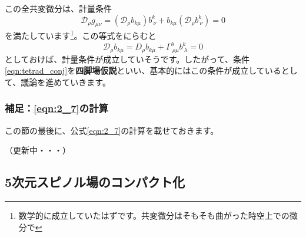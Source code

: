 \documentclass[unicode,a4paper,11pt]{ltjsarticle}
\begin{document}
この全共変微分は、計量条件
\begin{equation}
   \mathcal{D}_{\rho}g_{\mu\nu}
   =
   (\mathcal{D}_{\rho}b_{k\mu})b^{k}_{\ \nu}
   +
   b_{k\mu}(\mathcal{D}_{\rho}b^{k}_{\ \nu})
   =
   0
\end{equation}
を満たしています\footnote{
   数学的に成立していたはずです。共変微分はそもそも曲がった時空上での微分で
}。この等式をにらむと
\begin{equation}
   \mathcal{D}_{\rho}b_{k\mu}
   =
   D_{\rho}b_{k\mu}
   +
   \Gamma^{\lambda}_{\ \rho\mu} b^{k}_{\ \lambda}
   =
   0
   \label{eqn:tetrad_conj}
\end{equation}
としておけば、計量条件が成立していそうです。したがって、条件\eqref{eqn:tetrad_conj}を\textbf{四脚場仮説}といい、基本的にはこの条件が成立しているとして、議論を進めていきます。




\subsubsection*{補足：\texorpdfstring{\eqref{eqn:2_7}}{公式}の計算}

この節の最後に、公式\eqref{eqn:2_7}の計算を載せておきます。

（更新中・・・）










\subsection{5次元スピノル場のコンパクト化}
\end{document}
